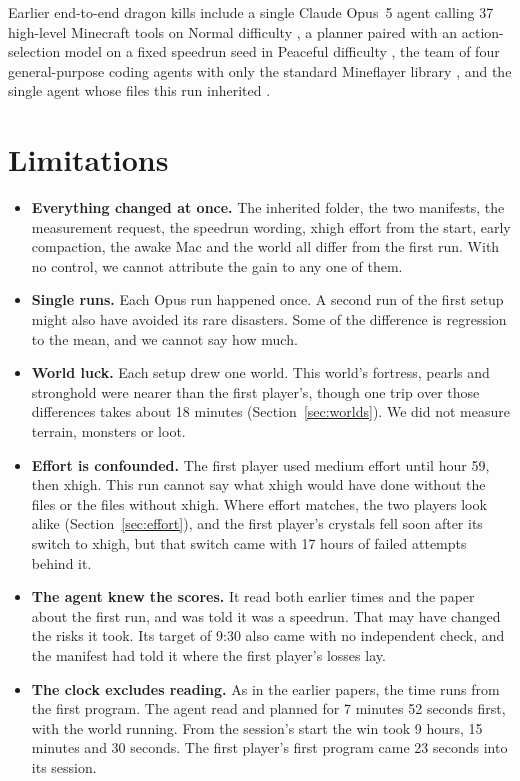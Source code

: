 \documentclass[11pt,a4paper]{article}
\begin{document}
Earlier end-to-end dragon kills include a single Claude Opus~5 agent calling 37 high-level Minecraft tools on Normal difficulty \citep{aibengineering2026}, a planner paired with an action-selection model on a fixed speedrun seed in Peaceful difficulty \citep{malde2026astra}, the team of four general-purpose coding agents with only the standard Mineflayer library \citep{faldor2026team}, and the single agent whose files this run inherited \citep{batsuk2026single}.

\section{Limitations}
\label{sec:limits}

\begin{itemize}
  \item \textbf{Everything changed at once.} The inherited folder, the two manifests, the measurement request, the speedrun wording, xhigh effort from the start, early compaction, the awake Mac and the world all differ from the first run. With no control, we cannot attribute the gain to any one of them.
  \item \textbf{Single runs.} Each Opus run happened once. A second run of the first setup might also have avoided its rare disasters. Some of the difference is regression to the mean, and we cannot say how much.
  \item \textbf{World luck.} Each setup drew one world. This world's fortress, pearls and stronghold were nearer than the first player's, though one trip over those differences takes about 18 minutes (Section~\ref{sec:worlds}). We did not measure terrain, monsters or loot.
  \item \textbf{Effort is confounded.} The first player used medium effort until hour 59, then xhigh. This run cannot say what xhigh would have done without the files or the files without xhigh. Where effort matches, the two players look alike (Section~\ref{sec:effort}), and the first player's crystals fell soon after its switch to xhigh, but that switch came with 17 hours of failed attempts behind it.
  \item \textbf{The agent knew the scores.} It read both earlier times and the paper about the first run, and was told it was a speedrun. That may have changed the risks it took. Its target of 9:30 also came with no independent check, and the manifest had told it where the first player's losses lay.
  \item \textbf{The clock excludes reading.} As in the earlier papers, the time runs from the first program. The agent read and planned for 7 minutes 52 seconds first, with the world running. From the session's start the win took 9 hours, 15 minutes and 30 seconds. The first player's first program came 23 seconds into its session.

\end{itemize}
\end{document}
